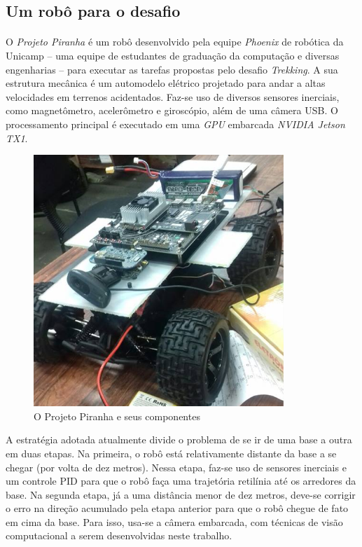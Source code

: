\documentclass[11pt]{report}
\newcommand{\tit}[1]{\textit{#1}}
\begin{document}
\subsection{Um robô para o desafio}
\paragraph{}
O \emph{Projeto Piranha} é um robô desenvolvido pela equipe \tit{Phoenix} de
robótica da Unicamp -- uma equipe de estudantes de graduação da computação e
diversas engenharias -- para executar as tarefas propostas pelo desafio 
\tit{Trekking}. 
A sua estrutura mecânica é um automodelo elétrico projetado para andar a altas
velocidades em terrenos acidentados. Faz-se uso de diversos sensores inerciais,
como magnetômetro, acelerômetro e giroscópio, além de uma câmera USB.
O processamento principal é executado em uma \tit{GPU} embarcada 
\tit{NVIDIA Jetson TX1}.

\begin{figure}[H]
	\centering
	\includegraphics[width=0.6\linewidth]{imgs/piranha.png}
	\caption{O Projeto Piranha e seus componentes}
\end{figure}

A estratégia adotada atualmente divide o problema de se ir de uma base a outra
em duas etapas. 
Na primeira, o robô está relativamente distante da base a se 
chegar (por volta de dez metros). Nessa etapa, faz-se uso de sensores inerciais
e um controle PID para que o robô faça uma trajetória retilínia até os 
arredores da base. 
Na segunda etapa, já a uma distância menor de dez metros, deve-se corrigir o 
erro na direção acumulado pela etapa anterior para que o robô chegue de fato
em cima da base. Para isso, usa-se a câmera embarcada, com técnicas de
visão computacional a serem desenvolvidas neste trabalho.
\end{document}
